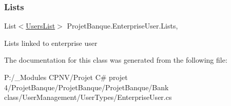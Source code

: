 \subsubsection{\texorpdfstring{Lists}{Lists}}
{\footnotesize\ttfamily List$<$\mbox{\hyperlink{class_projet_banque_1_1_users_list}{Users\+List}}$>$ Projet\+Banque.\+Enterprise\+User.\+Lists\hspace{0.3cm}{\ttfamily [get]}, {\ttfamily [set]}}



Lists linked to enterprise user 



The documentation for this class was generated from the following file\+:\begin{DoxyCompactItemize}
\item 
P\+:/\+\_\+\+Modules C\+P\+N\+V/\+Projet C\# projet 4/\+Projet\+Banque/\+Projet\+Banque/\+Projet\+Banque/\+Bank class/\+User\+Management/\+User\+Types/Enterprise\+User.\+cs\end{DoxyCompactItemize}
